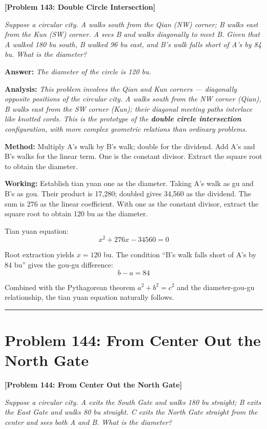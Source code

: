 \documentclass[11pt,a4paper]{book}
\newcommand{\answer}[1]{\noindent\textbf{\color{anacolor}Answer: }\textit{#1}\par}
\newcommand{\method}[1]{\noindent\textbf{\color{methodcolor}Method: }#1\par}
\newcommand{\working}[1]{\noindent\textbf{\color{workcolor}Working: }#1\par}
\newcommand{\analysis}[1]{\noindent\textbf{\color{anacolor}Analysis: }\textit{#1}\par}
\newcommand{\shortline}{\noindent\rule{0.5\textwidth}{0.4pt}\par}
\begin{document}
\noindent\textbf{\color{probcolor}[Problem 143: Double Circle Intersection]}

\textit{Suppose a circular city. A walks south from the Qian (NW) corner; B walks east from the Kun (SW) corner. A sees B and walks diagonally to meet B. Given that A walked 180 bu south, B walked 96 bu east, and B's walk falls short of A's by 84 bu. What is the diameter?}

\answer{The diameter of the circle is 120 bu.}

\analysis{This problem involves the Qian and Kun corners --- diagonally opposite positions of the circular city. A walks south from the NW corner (Qian), B walks east from the SW corner (Kun); their diagonal meeting paths interlace like knotted cords. This is the prototype of the \textbf{double circle intersection} configuration, with more complex geometric relations than ordinary problems.}

\method{Multiply A's walk by B's walk; double for the dividend. Add A's and B's walks for the linear term. One is the constant divisor. Extract the square root to obtain the diameter.}

\working{Establish tian yuan one as the diameter. Taking A's walk as gu and B's as gou. Their product is 17,280; doubled gives 34,560 as the dividend. The sum is 276 as the linear coefficient. With one as the constant divisor, extract the square root to obtain 120 bu as the diameter.

Tian yuan equation:
$$x^2 + 276x - 34560 = 0$$

Root extraction yields $x = 120$ bu. The condition ``B's walk falls short of A's by 84 bu'' gives the gou-gu difference:
$$b - a = 84$$

Combined with the Pythagorean theorem $a^2 + b^2 = c^2$ and the diameter-gou-gu relationship, the tian yuan equation naturally follows.}

\shortline

\section{Problem 144: From Center Out the North Gate}
\label{sec:prob144}

\noindent\textbf{\color{probcolor}[Problem 144: From Center Out the North Gate]}

\textit{Suppose a circular city. A exits the South Gate and walks 180 bu straight; B exits the East Gate and walks 80 bu straight. C exits the North Gate straight from the center and sees both A and B. What is the diameter?}
\end{document}
